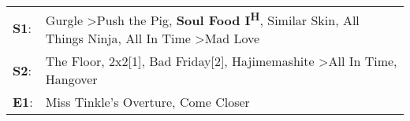 \begin{supertabular}{p{0.03\textwidth}p{0.92\textwidth}}
 \textbf{S1}:  &  Gurgle\textsuperscript{} \textgreater \enspace Push the Pig\textsuperscript{}, \enspace \textbf{Soul Food I\textsuperscript{H}}, \enspace Similar Skin\textsuperscript{}, \enspace All Things Ninja\textsuperscript{}, \enspace All In Time\textsuperscript{} \textgreater \enspace Mad Love\textsuperscript{}  \enspace  \\
 \textbf{S2}:  &                                                                     The Floor\textsuperscript{}, \enspace 2x2[1]\textsuperscript{}, \enspace Bad Friday[2]\textsuperscript{}, \enspace Hajimemashite\textsuperscript{} \textgreater \enspace All In Time\textsuperscript{}, \enspace Hangover\textsuperscript{}  \enspace  \\
 \textbf{E1}:  &                                                                                                                                                                                                                                Miss Tinkle's Overture\textsuperscript{}, \enspace Come Closer\textsuperscript{}  \enspace  \\
\end{supertabular}
